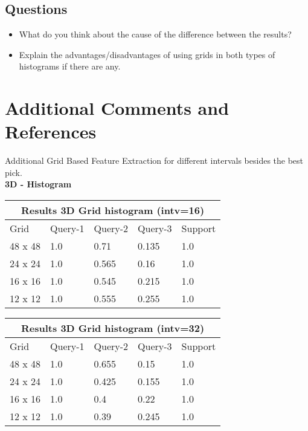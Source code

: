 \documentclass[12pt]{article}
\begin{document}
\subsection{Questions}
\begin{itemize}
\item What do you think about the cause of the difference between the results?
\item Explain the advantages/disadvantages of using grids in both types of histograms if there are any.
\end{itemize}


\section{Additional Comments and References}

Additional Grid Based Feature Extraction for different intervals besides the best pick. \\



\textbf{3D - Histogram} \\ 

\begin{tabular}{ |p{1.5cm}||p{2cm}|p{2cm}|p{2cm}|p{2cm}|  }
    \hline
    \multicolumn{5}{|c|}{Results 3D Grid histogram (intv=16)} \\
    \hline
    Grid & Query-1 & Query-2 & Query-3 & Support \\
    \hline
    48 x 48 & 1.0 & 0.71 & 0.135 & 1.0 \\
    \hline
    24 x 24 & 1.0 & 0.565 & 0.16 & 1.0 \\
    \hline
    16 x 16 & 1.0 & 0.545 & 0.215 & 1.0 \\
    \hline
    12 x 12 & 1.0 & 0.555 & 0.255 & 1.0 \\
    \hline
\end{tabular}

\begin{tabular}{ |p{1.5cm}||p{2cm}|p{2cm}|p{2cm}|p{2cm}|  }
    \hline
    \multicolumn{5}{|c|}{Results 3D Grid histogram (intv=32)} \\
    \hline
    Grid & Query-1 & Query-2 & Query-3 & Support \\
    \hline
    48 x 48 & 1.0 & 0.655 & 0.15 & 1.0 \\
    \hline
    24 x 24 & 1.0 & 0.425 & 0.155 & 1.0 \\
    \hline
    16 x 16 & 1.0 & 0.4 & 0.22 & 1.0 \\
    \hline
    12 x 12 & 1.0 & 0.39 & 0.245 & 1.0 \\
    \hline
\end{tabular}
\end{document}

